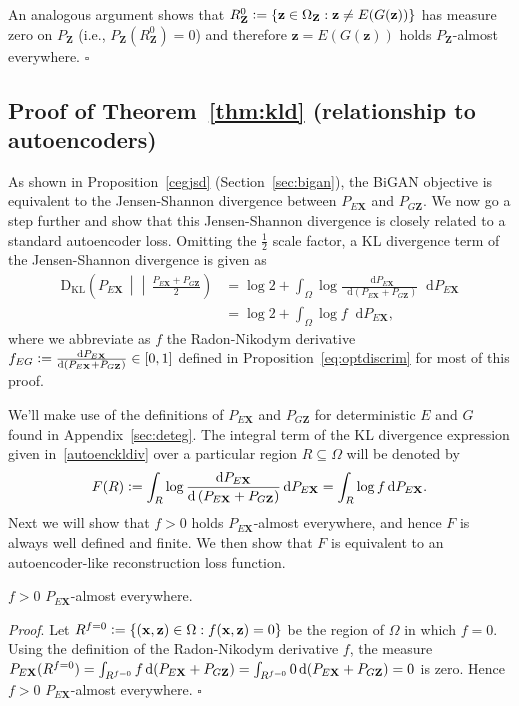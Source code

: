 \documentclass{article}
\newcommand{\proof}{\textit{Proof}.\xspace}
\newcommand{\kld}[2]{\mathrm{D_{KL}}\left(\left.#1\,\middle|\middle|\,#2\right.\right)}
\newcommand{\defeq}{\vcentcolon=}
\renewcommand{\d}{\mathop{}\!\mathrm{d}}
\def\smallint{\begingroup\textstyle \int\endgroup}
\renewcommand{\vec}[1]{\mathbf{#1}}
\newcommand{\x}{\vec{x}}
\newcommand{\X}{\vec{X}}
\newcommand{\z}{\vec{z}}
\newcommand{\Z}{\vec{Z}}
\newcommand{\OZ}{\Omega_\Z}
\newcommand{\refsec}[1]{Section~\ref{sec:#1}}
\newcommand{\lblsec}[1]{\label{sec:#1}}
\begin{document}
\begin{appendices}
An analogous argument shows that
$R^0_\Z \defeq \{ \z \in \OZ : \z \ne E(G(\z)) \}$ has measure zero on $P_\Z$ (i.e., $P_\Z(R^0_\Z)=0$) and therefore
$\z=E(G(\z))$ holds $P_\Z$-almost everywhere.
$\square$

\subsection{Proof of Theorem~\ref{thm:kld} (relationship to autoencoders)}
\lblsec{proof_aenc}
As shown in Proposition~\ref{cegjsd} (\refsec{bigan}), the BiGAN objective is equivalent to the Jensen-Shannon divergence between $P_{E\X}$ and $P_{G\Z}$.
We now go a step further and show that this Jensen-Shannon divergence is closely related to a standard autoencoder loss.
Omitting the $\tfrac{1}{2}$ scale factor, a KL divergence term of the Jensen-Shannon divergence is given as
\begin{align}
  \kld{P_{E\X}}{\tfrac{P_{E\X}+P_{G\Z}}{2}}
  \nonumber
  &= \log 2 + \int_{\Omega} \log \frac{\d P_{E\X}}{\d(P_{E\X} + P_{G\Z})} \d P_{E\X} \\
  &= \log 2 + \int_{\Omega} \log f \d P_{E\X}
  ,
\label{autoenckldiv}
\end{align}
where we abbreviate as $f$ the Radon-Nikodym derivative $
f_{EG}
\defeq
\frac{\d P_{E\X}}{\d \left(P_{E\X} + P_{G\Z}\right)}
\in [0, 1]
$ defined in Proposition~\ref{eq:optdiscrim} for most of this proof.

We'll make use of the definitions of $P_{E\X}$ and $P_{G\Z}$ for deterministic $E$ and $G$ found in Appendix~\ref{sec:deteg}.
The integral term of the KL divergence expression given in~\eqref{autoenckldiv} over a particular region $R \subseteq \Omega$ will be denoted by
$$F(R) \defeq \int_R \log \frac{\d P_{E\X}}{\d\left(P_{E\X} + P_{G\Z}\right)} \d P_{E\X}
=
\int_R \log f \d P_{E\X}
.$$
Next we will show that $f > 0$ holds $P_{E\X}$-almost everywhere, and hence $F$ is always well defined and finite.
We then show that $F$ is equivalent to an autoencoder-like reconstruction loss function.

\begin{proposition}
$f > 0$ $P_{E\X}$-almost everywhere. \label{prop:fgt0}
\end{proposition}
\proof
Let $R^{f=0} \defeq \left\{ (\x, \z) \in \Omega : f(\x, \z) = 0 \right\}$ be the region of $\Omega$ in which $f = 0$.
Using the definition of the Radon-Nikodym derivative $f$, the measure 
$
P_{E\X}(R^{f=0})
= \smallint_{R^{f=0}} f \d (P_{E\X} + P_{G\Z})
= \smallint_{R^{f=0}} 0 \d (P_{E\X} + P_{G\Z})
= 0
$
is zero. Hence $f > 0$ $P_{E\X}$-almost everywhere.
$\square$


\end{appendices}
\end{document}
